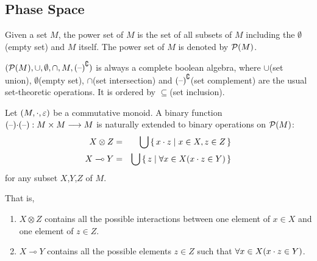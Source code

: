 
\subsection{Phase Space}
\def\fCenter{\subseteq}

\begin{definition} 
Given a set $M$,
the power set of  $M$ is the set of all subsets of $M$
including the $\emptyset$ (empty set) and $M$ itself.
The power set of $M$ is denoted by $\mathcal{P}(M)$.
\end{definition}
\begin{fact}
$(\mathcal{P}(M),\cup,\emptyset,\cap,M,{{(\mbox{\textendash})}}^{\complement}) $ 
is always a complete boolean algebra, 
where $\cup$(set union), $\emptyset$(empty set),
$\cap$(set intersection) and ${{(\mbox{\textendash})}}^{\complement}$(set complement) 
are the usual set-theoretic operations.
It is ordered by $\subseteq$(set inclusion).
\end{fact}
%
\begin{definition}
Let $(M,\cdot,\varepsilon)$ be a commutative monoid. 
A binary function
%
$ {{(\mbox{\textendash})}} { \cdot} {{(\mbox{\textendash})}} : M \times M \longrightarrow M$ 
%
is naturally extended to binary operations on $\mathcal{P}(M)$:
 \begin{eqnarray*}
 X \otimes Z  &=&  \bigcup \set{ x \cdot z | x \in X, z \in Z} \\
 X \multimap Y  &=&  \bigcup \set{ z  | \forall x \in X (x \cdot z \in Y)} 
 \end{eqnarray*}
 for any subset $X$,$Y$,$Z$ of $M$.
\end{definition}

That is, 
\begin{enumerate}
\item 
$ X \otimes Z$ contains all the possible interactions 
between one element of $x \in X$ and one element of $z \in Z$. 
\item 
$ X \multimap Y$ contains all the possible elements $z \in Z$
such that $\forall x \in X (x \cdot z \in Y)$.
\end{enumerate}

